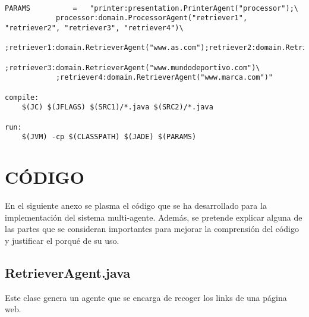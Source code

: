 \documentclass{pre-tfg}
\begin{document}
\begin{lstlisting}[caption=Makefile,style=makefile]

PARAMS 			= 	"printer:presentation.PrinterAgent("processor");\
			processor:domain.ProcessorAgent("retriever1", "retriever2", "retriever3", "retriever4")\
			;retriever1:domain.RetrieverAgent("www.as.com");retriever2:domain.RetrieverAgent("www.sports.es")\
			;retriever3:domain.RetrieverAgent("www.mundodeportivo.com")\
			;retriever4:domain.RetrieverAgent("www.marca.com")" 

compile:
	$(JC) $(JFLAGS) $(SRC1)/*.java $(SRC2)/*.java

run:
	$(JVM) -cp $(CLASSPATH) $(JADE) $(PARAMS)

\end{lstlisting}

\newpage

\appendix
\section{CÓDIGO}

En el siguiente anexo se plasma el código que se ha desarrollado para la implementación del sistema multi-agente. Además,
se pretende explicar alguna de las partes que se consideran importantes para mejorar la comprensión del código y justificar
el porqué de su uso.

\subsection{RetrieverAgent.java}

Este clase genera un agente que se encarga de recoger los links de una página web.
\end{document}
